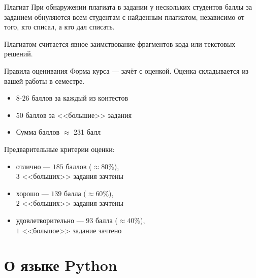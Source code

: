 \documentclass[11pt, fleqn, xcolor=x11names]{beamer}
\begin{document}
\begin{frame}{Плагиат}
	При обнаружении плагиата в задании у нескольких студентов баллы за заданием обнуляются всем студентам с найденным плагиатом, независимо от того, кто списал, а кто дал списать.
	
	\hfill
	
	Плагиатом считается явное заимствование фрагментов кода или текстовых решений. 
\end{frame}


\begin{frame}{Правила оценивания}
Форма курса --- зачёт с оценкой. Оценка складывается из вашей работы в семестре.

\begin{itemize}
	\item $8$-$26$ баллов за каждый из контестов
	\item $50$ баллов за <<большие>> задания
	\item Сумма баллов $\approx$ 231 балл
\end{itemize}

\hfill

Предварительные критерии оценки:
\begin{itemize}
	\item отлично --- $185$ баллов ($\approx 80\%$),\\ $3$ <<больших>> задания зачтены
	\item хорошо --- $139$ балла ($\approx 60\%$),\\ $2$ <<больших>> задания зачтены
	\item удовлетворительно --- $93$ балла ($\approx 40\%$),\\ $1$ <<большое>> задание зачтено
\end{itemize}
\end{frame}

\section{О языке Python}
\subsection*{}
\end{document}
